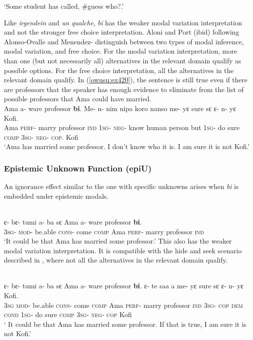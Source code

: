\documentclass[output=paper,modfonts,nonflat,draftmode]{langsci/langscibook}
\begin{document}
\glt `Some student has called, \#guess who?.' 
\z \z

Like \emph{irgendein} and \emph{un qualche}, \emph{bi} has the weaker modal variation interpretation and not the stronger free choice interpretation. Aloni and Port (ibid) following Alonso-Ovalle and Menendez-\citet{Benito2010} distinguish between two types of modal inference, modal variation, and free choice. 
For the modal variation interpretation, more than one (but not necessarily all) alternatives in the relevant domain qualify as possible options. For the free choice interpretation, all the alternatives in the relevant domain qualify. In (\ref{owusu:ex420}), the sentence is still true even if there are professors that the speaker has enough evidence to eliminate from the list of possible professors that Ama could have married.
\ea\label{owusu:ex420}\\
 \gll  Ama a- ware professor \textbf{bi}. Me- n- nim nipa koro nanso me- yε sure sε ε- n- yε Kofi.\\
Ama \textsc{perf}- marry professor \textsc{ind} \textsc{1sg}- \textsc{neg}- know human person but \textsc{1sg}- do sure \textsc{comp}  \textsc{3sg}- \textsc{neg}- \textsc{cop}. Kofi \\
    
\glt `Ama has married some professor. I don't know who it is. I am sure it is not Kofi.' 
\z 

\subsubsection{Epistemic Unknown Function (epiU)}
An ignorance effect similar to the one with specific unknowns arises when \emph{bi} is embedded under epistemic modals.

\ea\label{owusu:ex42a}\\
 \gll  ε- bε- tumi a- ba sε Ama a- ware professor \textbf{bi}. 
\\
\textsc{3sg}- \textsc{mod}- be.able \textsc{cons}- come \textsc{comp} Ama \textsc{perf}- marry professor \textsc{ind} \\
    
\glt `It could be that Ama has married some professor.' 
\z 
This also has the weaker modal variation interpretation. It is compatible with the hide and seek scenario described in \citet{AloniPort2015}, where not all the alternatives in the relevant domain qualify.

\ea\label{owusu:ex42b}\\
 \gll  ε- bε- tumi a- ba sε Ama a- ware professor \textbf{bi}. ε- te saa a  me- yε sure sε ε- n- yε Kofi. \\
\textsc{3sg} 
 \textsc{mod}- be.able \textsc{cons}- come \textsc{comp} Ama \textsc{perf}- marry professor \textsc{ind} \textsc{3sg}- \textsc{cop} \textsc{dem} \textsc{cond} \textsc{1sg}- do sure \textsc{comp}  \textsc{3sg}- \textsc{neg}- \textsc{cop} Kofi\\
\glt ` It could be that Ama has married some professor. If that is true, I am sure it is not Kofi.' 
\z 
\end{document}

